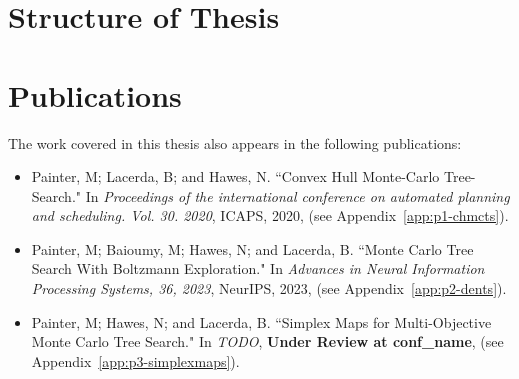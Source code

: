 


\section{Structure of Thesis}
\label{sec:1-3-thesis-structure}


\section{Publications}
\label{sec:1-4-publications}


    The work covered in this thesis also appears in the following publications:
    \begin{itemize}
        \item Painter, M; Lacerda, B; and Hawes, N. ``Convex Hull Monte-Carlo Tree-Search." In \textit{Proceedings of the international conference on automated planning and scheduling. Vol. 30. 2020}, ICAPS, 2020, (see Appendix~\ref{app:p1-chmcts}).
        \item Painter, M; Baioumy, M; Hawes, N; and Lacerda, B.  ``Monte Carlo Tree Search With Boltzmann Exploration." In \textit{Advances in Neural Information Processing Systems, 36, 2023}, NeurIPS, 2023, (see Appendix~\ref{app:p2-dents}).
        \item Painter, M; Hawes, N; and Lacerda, B. ``Simplex Maps for Multi-Objective Monte Carlo Tree Search." In \textit{TODO}, \textbf{Under Review at conf\_name}, (see Appendix~\ref{app:p3-simplexmaps}).
    \end{itemize}